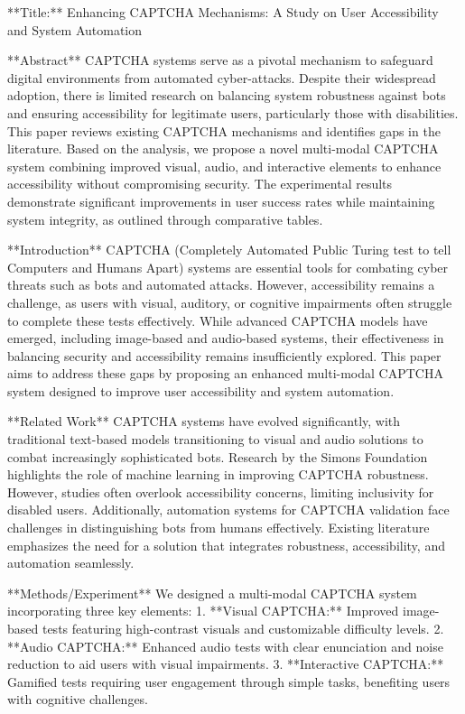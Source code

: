 **Title:** Enhancing CAPTCHA Mechanisms: A Study on User Accessibility and System Automation  

**Abstract**  
CAPTCHA systems serve as a pivotal mechanism to safeguard digital environments from automated cyber-attacks. Despite their widespread adoption, there is limited research on balancing system robustness against bots and ensuring accessibility for legitimate users, particularly those with disabilities. This paper reviews existing CAPTCHA mechanisms and identifies gaps in the literature. Based on the analysis, we propose a novel multi-modal CAPTCHA system combining improved visual, audio, and interactive elements to enhance accessibility without compromising security. The experimental results demonstrate significant improvements in user success rates while maintaining system integrity, as outlined through comparative tables.  

**Introduction**  
CAPTCHA (Completely Automated Public Turing test to tell Computers and Humans Apart) systems are essential tools for combating cyber threats such as bots and automated attacks. However, accessibility remains a challenge, as users with visual, auditory, or cognitive impairments often struggle to complete these tests effectively. While advanced CAPTCHA models have emerged, including image-based and audio-based systems, their effectiveness in balancing security and accessibility remains insufficiently explored. This paper aims to address these gaps by proposing an enhanced multi-modal CAPTCHA system designed to improve user accessibility and system automation.  

**Related Work**  
CAPTCHA systems have evolved significantly, with traditional text-based models transitioning to visual and audio solutions to combat increasingly sophisticated bots. Research by the Simons Foundation highlights the role of machine learning in improving CAPTCHA robustness. However, studies often overlook accessibility concerns, limiting inclusivity for disabled users. Additionally, automation systems for CAPTCHA validation face challenges in distinguishing bots from humans effectively. Existing literature emphasizes the need for a solution that integrates robustness, accessibility, and automation seamlessly.  

**Methods/Experiment**  
We designed a multi-modal CAPTCHA system incorporating three key elements:  
1. **Visual CAPTCHA:** Improved image-based tests featuring high-contrast visuals and customizable difficulty levels.  
2. **Audio CAPTCHA:** Enhanced audio tests with clear enunciation and noise reduction to aid users with visual impairments.  
3. **Interactive CAPTCHA:** Gamified tests requiring user engagement through simple tasks, benefiting users with cognitive challenges.  

